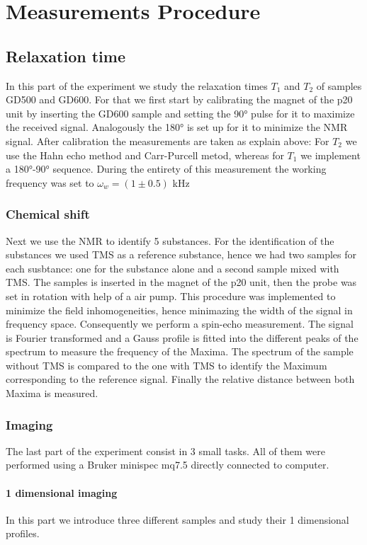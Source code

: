 \section{Measurements Procedure}
\subsection{Relaxation time}
In this part of the experiment we study the relaxation times $T_1$ and $T_2$ of samples GD500 and GD600. For that we first start by calibrating the magnet of the p20 unit by inserting the GD600 sample and setting the 90° pulse for it to maximize the received signal. Analogously the 180° is set up for it to minimize the NMR signal. 
After calibration the measurements are taken as explain above: For $T_2$ we use the Hahn echo method and Carr-Purcell metod, whereas for $T_1$ we implement a 180°-90° sequence. 
During the entirety of this measurement the working frequency was set to $\omega_w = (1 \pm 0.5)$ kHz
\subsubsection{Chemical shift}
Next we use the NMR to identify 5 substances. For the identification of the substances we used TMS as a reference substance, hence we had two samples for each susbtance: one for the substance alone and a second sample mixed with TMS.
The samples is inserted in the magnet of the p20 unit, then the probe was set in rotation with help of a air pump. This procedure was implemented to minimize the field inhomogeneities, hence minimazing the width of the signal in frequency space. Consequently we perform a spin-echo measurement. The signal is Fourier transformed and a Gauss profile is fitted into the different peaks of the spectrum to measure the frequency of the Maxima. 
The spectrum of the sample without TMS is compared to the one with TMS to identify the Maximum corresponding to the reference signal. Finally the relative distance between both Maxima is measured. 
\subsubsection{Imaging}
The last part of the experiment consist in 3 small tasks. All of them were performed using a Bruker minispec mq7.5 directly connected to  computer.
\paragraph{1 dimensional imaging}
In this part we introduce three different samples and study their 1 dimensional profiles. 

